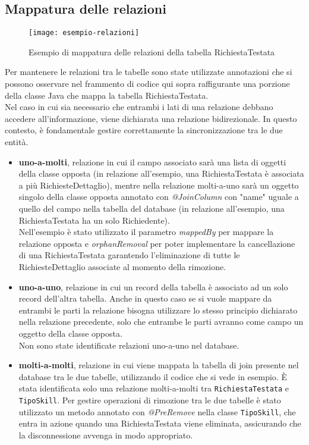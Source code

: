\subsection{Mappatura delle relazioni}
\begin{figure}[H] 
    \centering 
    \texttt{[image: esempio-relazioni]} 
    \caption{Esempio di mappatura delle relazioni della tabella RichiestaTestata}
\end{figure}
\noindent Per mantenere le relazioni tra le tabelle sono state utilizzate annotazioni che si possono osservare nel frammento di codice qui sopra raffigurante una porzione della classe Java che mappa la tabella RichiestaTestata.\\
Nel caso in cui sia necessario che entrambi i lati di una relazione debbano accedere all'informazione, viene dichiarata una relazione bidirezionale. In questo contesto, è fondamentale gestire correttamente la sincronizzazione tra le due entità.
\begin{itemize}
\item \textbf{uno-a-molti}, relazione in cui il campo associato sarà una lista di oggetti della classe opposta (in relazione all'esempio, una RichiestaTestata è associata a più RichiesteDettaglio), mentre nella relazione molti-a-uno sarà un oggetto singolo della classe opposta annotato con \textit{@JoinColumn} con "name" uguale a quello del campo nella tabella del database (in relazione all'esempio, una RichiestaTestata ha un solo Richiedente).\\
Nell'esempio è stato utilizzato il parametro \textit{mappedBy} per mappare la relazione opposta e \textit{orphanRemoval} per poter implementare la cancellazione di una RichiestaTestata garantendo l'eliminazione di tutte le RichiesteDettaglio associate al momento della rimozione.
\item \textbf{uno-a-uno}, relazione in cui un record della tabella è associato ad un solo record dell'altra tabella. Anche in questo caso se si vuole mappare da entrambi le parti la relazione bisogna utilizzare lo stesso principio dichiarato nella relazione precedente, solo che entrambe le parti avranno come campo un oggetto della classe opposta.\\
Non sono state identificate relazioni uno-a-uno nel database.
\item \textbf{molti-a-molti}, relazione in cui viene mappata la tabella di join presente nel database tra le due tabelle, utilizzando il codice che si vede in esempio.
È stata identificata solo una relazione molti-a-molti tra \texttt{RichiestaTestata} e \texttt{TipoSkill}. Per gestire operazioni di rimozione tra le due tabelle è stato utilizzato un metodo annotato con \textit{@PreRemove} nella classe \texttt{TipoSkill}, che entra in azione quando una RichiestaTestata viene eliminata, assicurando che la disconnessione avvenga in modo appropriato.
\end{itemize}
